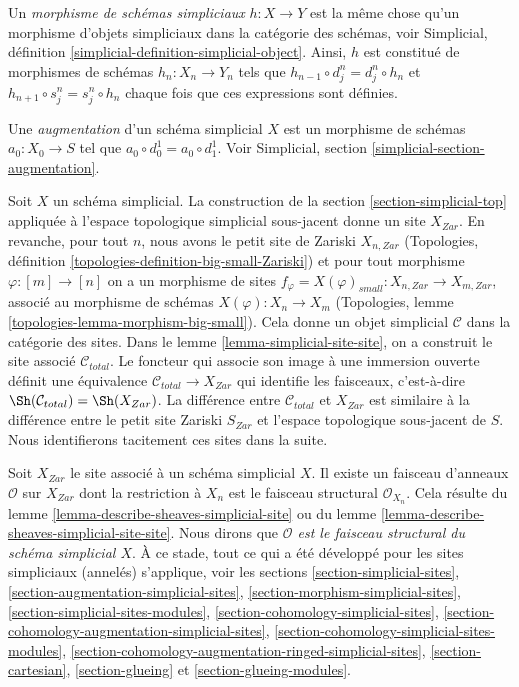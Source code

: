 \medskip\noindent
Un {\it morphisme de schémas simpliciaux} $h : X \to Y$ est la même chose
qu'un morphisme d'objets simpliciaux dans la catégorie des schémas,
voir Simplicial, définition \ref{simplicial-definition-simplicial-object}.
Ainsi, $h$ est constitué de morphismes de schémas $h_n : X_n \to Y_n$
tels que $h_{n - 1} \circ d^n_j = d^n_j \circ h_n$ et
$h_{n + 1} \circ s^n_j = s^n_j \circ h_n$ chaque fois que ces expressions sont définies.

\medskip\noindent
Une {\it augmentation} d'un schéma simplicial $X$ est un morphisme
de schémas $a_0 : X_0 \to S$ tel que $a_0 \circ d^1_0 = a_0 \circ d^1_1$.
Voir Simplicial, section \ref{simplicial-section-augmentation}.

\medskip\noindent
Soit $X$ un schéma simplicial. La construction de la section
\ref{section-simplicial-top} appliquée à l'espace topologique simplicial
sous-jacent donne un site $X_{Zar}$.
En revanche, pour tout $n$, nous avons le petit site de Zariski
$X_{n, Zar}$ (Topologies, définition
\ref{topologies-definition-big-small-Zariski})
et pour tout morphisme $\varphi : [m] \to [n]$
on a un morphisme de sites
$f_\varphi = X(\varphi)_{small} : X_{n, Zar} \to X_{m, Zar}$,
associé au morphisme de schémas
$X(\varphi) : X_n \to X_m$ (Topologies, lemme
\ref{topologies-lemma-morphism-big-small}).
Cela donne un objet simplicial $\mathcal{C}$ dans la catégorie des sites.
Dans le lemme \ref{lemma-simplicial-site-site}, on a construit le site
associé $\mathcal{C}_{total}$. Le foncteur qui associe son image à une immersion ouverte
définit une équivalence $\mathcal{C}_{total} \to X_{Zar}$ qui
identifie les faisceaux, c'est-à-dire $\Sh(\mathcal{C}_{total}) = \Sh(X_{Zar})$.
La différence entre $\mathcal{C}_{total}$ et $X_{Zar}$
est similaire à la différence entre le petit site Zariski $S_{Zar}$
et l'espace topologique sous-jacent de $S$.
Nous identifierons tacitement ces sites dans la suite.

\medskip\noindent
Soit $X_{Zar}$ le site associé à un schéma simplicial $X$.
Il existe un faisceau d'anneaux $\mathcal{O}$ sur $X_{Zar}$ dont la restriction
à $X_n$ est le faisceau structural $\mathcal{O}_{X_n}$. Cela résulte
du lemme \ref{lemma-describe-sheaves-simplicial-site} ou du lemme
\ref{lemma-describe-sheaves-simplicial-site-site}. Nous dirons que
{\it $\mathcal{O}$ est le faisceau structural du schéma simplicial $X$}.
À ce stade, tout ce qui a été développé pour les sites simpliciaux (annelés)
s'applique, voir les sections \ref{section-simplicial-sites},
\ref{section-augmentation-simplicial-sites},
\ref{section-morphism-simplicial-sites},
\ref{section-simplicial-sites-modules},
\ref{section-cohomology-simplicial-sites},
\ref{section-cohomology-augmentation-simplicial-sites},
\ref{section-cohomology-simplicial-sites-modules},
\ref{section-cohomology-augmentation-ringed-simplicial-sites},
\ref{section-cartesian},
\ref{section-glueing} et
\ref{section-glueing-modules}.

